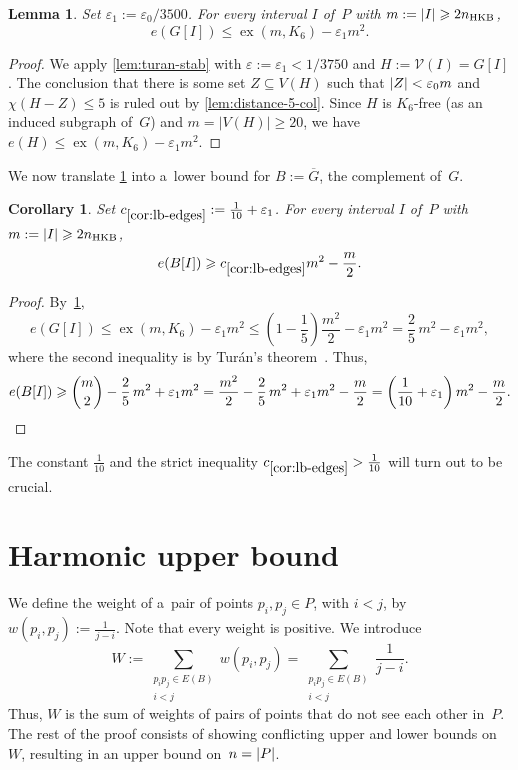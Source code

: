 \documentclass[11pt,a4paper]{article}
\let\qedhere\relax
\newtheorem{lemma}{Lemma}
\newtheorem{corollary}{Corollary}
\newcommand{\vis}{\mathcal V}
\newcommand{\hkb}{n_{\mathrm{HKB}}}
\DeclareMathOperator{\ex}{ex}
\begin{document}
\begin{lemma}\label{lem:ub-edges}
  Set $\varepsilon_1 := \varepsilon_0/3500$.
  For every interval $I$ of~$P$ with $m := \abs{I} \geqslant 2 \hkb$,
  \[e(G[I]) \leqslant \ex(m,K_6) - \varepsilon_1 m^2.\]
\end{lemma}

\begin{proof}
  We apply \cref{lem:turan-stab} with $\varepsilon := \varepsilon_1 < 1/3750$ and $H := \vis(I) = G[I]$.
  The conclusion that there is some set $Z \subseteq V(H)$ such that $\mathopen| Z \mathclose| < \varepsilon_0 m$ and $\chi(H-Z) \leqslant 5$ is ruled out by \cref{lem:distance-5-col}.
  Since $H$ is $K_6$-free (as an induced subgraph of~$G$) and $m = |V(H)| \geqslant 20$, we have $e(H) \leqslant \ex(m,K_6)-\varepsilon_1 m^2$.
\end{proof}

We now translate \cref{lem:ub-edges} into a~lower bound for $B := \overline G$, the complement of~$G$.

\begin{corollary}\label{cor:lb-edges}
  Set $c_{\ref{cor:lb-edges}} := \frac{1}{10} + \varepsilon_1$.
  For every interval $I$ of~$P$ with $m := \abs{I} \geqslant 2 \hkb$,
  \[e(B[I]) \geqslant c_{\ref{cor:lb-edges}} m^2 - \frac{m}{2}.\]
\end{corollary}

\begin{proof}
  By~\cref{lem:ub-edges}, \[e(G[I]) \leqslant \ex(m,K_6) - \varepsilon_1 m^2 \leqslant \left(1-\frac{1}{5}\right)\frac{m^2}{2} - \varepsilon_1 m^2 = \frac{2}{5}\,m^2 - \varepsilon_1 m^2,\]
  where the second inequality is by Tur\'an's theorem~\cite{Turan41}.
  Thus,
  \[e(B[I]) \geqslant \binom{m}{2} - \frac{2}{5}\,m^2 + \varepsilon_1 m^2 = \frac{m^2}{2} - \frac{2}{5}\,m^2 + \varepsilon_1 m^2 - \frac{m}{2} = \left(\frac{1}{10}+\varepsilon_1\right)m^2 - \frac{m}{2}.\qedhere\]
\end{proof}

The constant $\frac{1}{10}$ and the strict inequality $c_{\ref{cor:lb-edges}} > \frac{1}{10}$ will turn out to be crucial.

\section{Harmonic upper bound}

We define the weight of a~pair of points $p_i, p_j \in P$, with $i < j$, by $w(p_i,p_j) := \frac{1}{j-i}$.
Note that every weight is positive.
We introduce \[W := \sum\limits_{\substack{p_ip_j \in E(B)\\i<j}} w(p_i,p_j) = \sum\limits_{\substack{p_ip_j \in E(B)\\i<j}} \frac{1}{j-i}.\]
Thus, $W$ is the sum of weights of pairs of points that do not see each other in~$P$.
The rest of the proof consists of showing conflicting upper and lower bounds on~$W$, resulting in an upper bound on~$n = \mathopen| P \mathclose|$.
\end{document}
